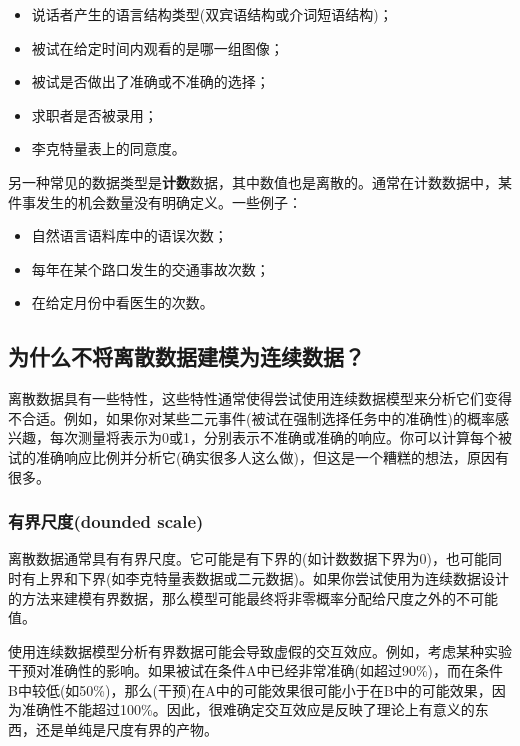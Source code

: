 \documentclass[
]{book}
\providecommand{\tightlist}{%
  \setlength{\itemsep}{0pt}\setlength{\parskip}{0pt}}
\begin{document}
\begin{itemize}
\tightlist
\item
  说话者产生的语言结构类型(双宾语结构或介词短语结构)；
\item
  被试在给定时间内观看的是哪一组图像；
\item
  被试是否做出了准确或不准确的选择；
\item
  求职者是否被录用；
\item
  李克特量表上的同意度。
\end{itemize}

另一种常见的数据类型是\textbf{计数}数据，其中数值也是离散的。通常在计数数据中，某件事发生的机会数量没有明确定义。一些例子：

\begin{itemize}
\tightlist
\item
  自然语言语料库中的语误次数；
\item
  每年在某个路口发生的交通事故次数；
\item
  在给定月份中看医生的次数。
\end{itemize}

\hypertarget{ux4e3aux4ec0ux4e48ux4e0dux5c06ux79bbux6563ux6570ux636eux5efaux6a21ux4e3aux8fdeux7eedux6570ux636e}{%
\subsection{为什么不将离散数据建模为连续数据？}\label{ux4e3aux4ec0ux4e48ux4e0dux5c06ux79bbux6563ux6570ux636eux5efaux6a21ux4e3aux8fdeux7eedux6570ux636e}}

离散数据具有一些特性，这些特性通常使得尝试使用连续数据模型来分析它们变得不合适。例如，如果你对某些二元事件(被试在强制选择任务中的准确性)的概率感兴趣，每次测量将表示为0或1，分别表示不准确或准确的响应。你可以计算每个被试的准确响应比例并分析它(确实很多人这么做)，但这是一个糟糕的想法，原因有很多。

\hypertarget{ux6709ux754cux5c3aux5ea6dounded-scale}{%
\subsubsection{有界尺度(dounded scale)}\label{ux6709ux754cux5c3aux5ea6dounded-scale}}

离散数据通常具有有界尺度。它可能是有下界的(如计数数据下界为0)，也可能同时有上界和下界(如李克特量表数据或二元数据)。如果你尝试使用为连续数据设计的方法来建模有界数据，那么模型可能最终将非零概率分配给尺度之外的不可能值。

使用连续数据模型分析有界数据可能会导致虚假的交互效应。例如，考虑某种实验干预对准确性的影响。如果被试在条件A中已经非常准确(如超过90\%)，而在条件B中较低(如50\%)，那么(干预)在A中的可能效果很可能小于在B中的可能效果，因为准确性不能超过100\%。因此，很难确定交互效应是反映了理论上有意义的东西，还是单纯是尺度有界的产物。
\end{document}
